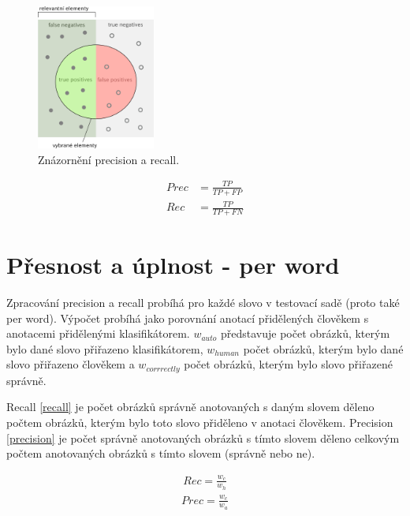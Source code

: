 \documentclass[czech,BP]{thesiskiv}
\begin{document}
\begin{multicols}{2}
	\begin{figure}[H]
		    \centering
		\includegraphics[height=180px]{./img/recall_precision.png}
		\caption{Znázornění precision a recall.}
	\end{figure}
	\begin{center}
		\begin{align}
   			\label{precision2} Prec &= \frac{TP}{TP + FP} \\[30pt]
   			\label{recall2} Rec &= \frac{TP}{TP + FN}
		\end{align}

	\end{center}
\end{multicols}

\section{Přesnost a úplnost - per word}
\par Zpracování precision a recall probíhá pro každé slovo v testovací sadě (proto také per word). Výpočet probíhá jako porovnání anotací přidělených člověkem s anotacemi přidělenými klasifikátorem. $w_{auto}$ představuje počet obrázků, kterým bylo dané slovo přiřazeno klasifikátorem, $w_{human}$ počet obrázků, kterým bylo dané slovo přiřazeno člověkem a $w_{corrrectly}$ počet obrázků, kterým bylo slovo přiřazené správně. 

\par Recall \eqref{recall} je počet obrázků správně anotovaných s daným slovem děleno počtem obrázků, kterým bylo toto slovo přiděleno v anotaci člověkem. Precision \eqref{precision} je počet správně anotovaných obrázků s tímto slovem děleno celkovým počtem anotovaných obrázků s tímto slovem (správně nebo ne). 

\begin{align}
   \label{recall} Rec = \frac{w_c}{w_h}
\end{align}
\begin{align}
   \label{precision} Prec = \frac{w_c}{w_a}
\end{align}
\end{document}

